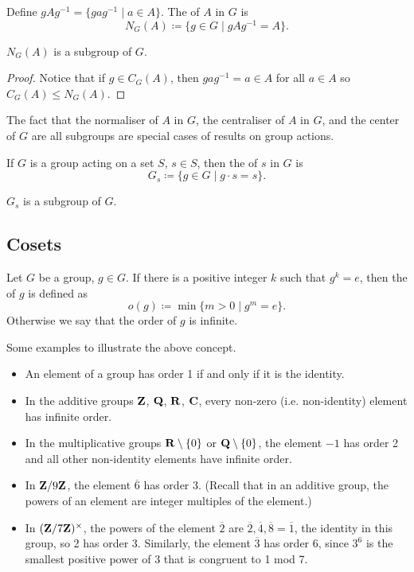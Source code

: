 \begin{example}[Normaliser]
Define $gAg^{-1}=\{gag^{-1}\mid a\in A\}$. The  of $A$ in $G$ is
\[N_G(A)\coloneqq\{g\in G\mid gAg^{-1}=A\}.\]

\begin{proposition}
$N_G(A)$ is a subgroup of $G$.
\end{proposition}

\begin{proof}
Notice that if $g\in C_G(A)$, then $gag^{-1}=a\in A$ for all $a\in A$ so $C_G(A)\le N_G(A)$.
\end{proof}
\end{example}

The fact that the normaliser of $A$ in $G$, the centraliser of $A$ in $G$, and the center of $G$ are all subgroups are special cases of results on group actions.

\begin{example}[Stabiliser]
If $G$ is a group acting on a set $S$, $s\in S$, then the  of $s$ in $G$ is
\[G_s\coloneqq\{g\in G\mid g\cdot s=s\}.\]

\begin{proposition}
$G_s$ is a subgroup of $G$.
\end{proposition}
\end{example}

\subsection{Cosets}
\begin{definition}[Order]
Let $G$ be a group, $g\in G$. If there is a positive integer $k$ such that $g^k=e$, then the  of $g$ is defined as
\[o(g)\coloneqq\min\{m>0\mid g^m=e\}.\]
Otherwise we say that the order of $g$ is infinite.
\end{definition}

\begin{example}
Some examples to illustrate the above concept.
\begin{itemize}
\item An element of a group has order 1 if and only if it is the identity.
\item In the additive groups $\mathbf Z$, $\mathbf Q$, $\mathbf R$, $\mathbf C$, every non-zero (i.e. non-identity) element has infinite order.
\item In the multiplicative groups $\mathbf R\setminus\{0\}$ or $\mathbf Q\setminus\{0\}$, the element $-1$ has order 2 and all other non-identity elements have infinite order.
\item In $\mathbf Z/9\mathbf Z$, the element $\overline{6}$ has order 3. (Recall that in an additive group, the powers of an element are integer multiples of the element.)
\item In $(\mathbf Z/7\mathbf Z)^\times$, the powers of the element $\overline{2}$ are $\overline{2},\overline{4},\overline{8}=\overline{1}$, the identity in this group, so 2 has order 3. Similarly, the element $\overline{3}$ has order 6, since $3^6$ is the smallest positive power of 3 that is congruent to 1 mod 7.
\end{itemize}
\end{example}

